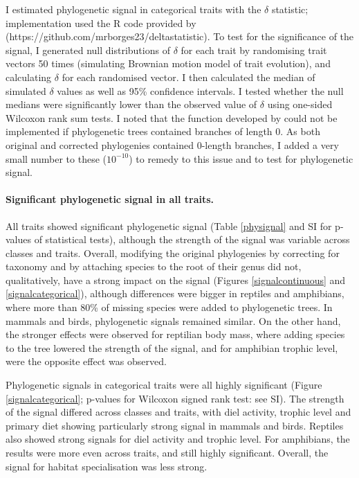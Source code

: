 I estimated phylogenetic signal in categorical traits with the $\delta$ statistic; implementation used the R code provided by \cite{Borges2018} (https://github.com/mrborges23/delta\textunderscore statistic). To test for the significance of the signal, I generated null distributions of $\delta$  for each trait by randomising trait vectors 50 times (simulating Brownian motion model of trait evolution), and calculating $\delta$ for each randomised vector. I then calculated the median of simulated $\delta$ values as well as 95\% confidence intervals. I tested whether the null medians were significantly lower than the observed value of $\delta$ using one-sided Wilcoxon rank sum tests. I noted that the function developed by \cite{Borges2018} could not be implemented if phylogenetic trees contained branches of length 0. As both original and corrected phylogenies contained 0-length branches, I added a very small number to these ($10^{-10}$) to remedy to this issue and to test for phylogenetic signal. 

\paragraph{Significant phylogenetic signal in all traits.}
All traits showed significant phylogenetic signal (Table \ref{physignal} and SI for p-values of statistical tests), although the strength of the signal was variable across classes and traits. Overall, modifying the original phylogenies by correcting for taxonomy and by attaching species to the root of their genus did not, qualitatively, have a strong impact on the signal (Figures \ref{signalcontinuous} and \ref{signalcategorical}), although differences were bigger in reptiles and amphibians, where more than 80\% of missing species were added to phylogenetic trees. In mammals and birds, phylogenetic signals remained similar. On the other hand, the stronger effects were observed for reptilian body mass, where adding species to the tree lowered the strength of the signal, and for amphibian trophic level, were the opposite effect was observed.

Phylogenetic signals in categorical traits were all highly significant (Figure \ref{signalcategorical}; p-values for Wilcoxon signed rank test: see SI). The strength of the signal differed across classes and traits, with diel activity, trophic level and primary diet showing particularly strong signal in mammals and birds. Reptiles also showed strong signals for diel activity and trophic level. For amphibians, the results were more even across traits, and still highly significant. Overall, the signal for habitat specialisation was less strong.

